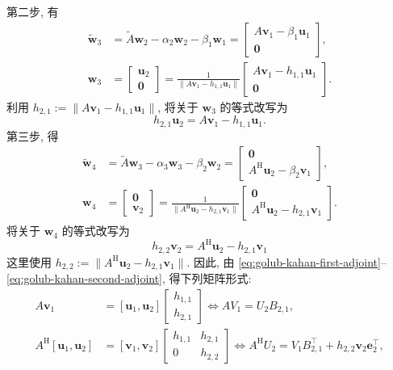 {第二步, 有}
\[\begin{aligned}\widetilde{\bm w}_3&=\widetilde A\bm w_2-\alpha_2\bm w_2-\beta_1\bm w_1=\begin{bmatrix}A\bm v_1-\beta_1\bm u_1\\\bm0\end{bmatrix},\\
\bm w_3&=\begin{bmatrix}\bm u_2\\\bm0\end{bmatrix}=\frac1{\|A\bm v_1-h_{1,1}\bm u_1\|}\begin{bmatrix}A\bm v_1-h_{1,1}\bm u_1\\\bm0\end{bmatrix}.\end{aligned}\]
{利用 $h_{2,1}:=\|A\bm v_1-h_{1,1}\bm u_1\|$, 将关于 $\bm w_3$ 的等式改写为}
\begin{equation}\label{eq:golub-kahan-first-forward}h_{2,1}\bm u_2=A\bm v_1-h_{1,1}\bm u_1.\end{equation}
{第三步, 得}
\[\begin{aligned}\widetilde{\bm w}_4&=\widetilde A\bm w_3-\alpha_3\bm w_3-\beta_2\bm w_2=\begin{bmatrix}\bm0\\A^{\mathrm H}\bm u_2-\beta_2\bm v_1\end{bmatrix},\\
\bm w_4&=\begin{bmatrix}\bm0\\\bm v_2\end{bmatrix}=\frac1{\|A^{\mathrm H}\bm u_2-h_{2,1}\bm v_1\|}\begin{bmatrix}\bm0\\A^{\mathrm H}\bm u_2-h_{2,1}\bm v_1\end{bmatrix}.\end{aligned}\]
{将关于 $\bm w_4$ 的等式改写为}
\begin{equation}\label{eq:golub-kahan-second-adjoint}h_{2,2}\bm v_2=A^{\mathrm H}\bm u_2-h_{2,1}\bm v_1\end{equation}
{这里使用 $h_{2,2}:=\|A^{\mathrm H}\bm u_2-h_{2,1}\bm v_1\|$. 因此, 由 \eqref{eq:golub-kahan-first-adjoint}--\eqref{eq:golub-kahan-second-adjoint}, 得下列矩阵形式:}
\[\begin{aligned}A\bm v_1&=[\bm u_1,\bm u_2]\begin{bmatrix}h_{1,1}\\h_{2,1}\end{bmatrix}\Leftrightarrow AV_1=U_2B_{2,1},\\
A^{\mathrm H}[\bm u_1,\bm u_2]&=[\bm v_1,\bm v_2]\begin{bmatrix}h_{1,1}&h_{2,1}\\0&h_{2,2}\end{bmatrix}\Leftrightarrow A^{\mathrm H}U_2=V_1B_{2,1}^{\top}+h_{2,2}\bm v_2\bm e_2^{\top},\end{aligned}\]
